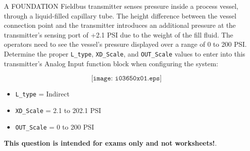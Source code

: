 

A FOUNDATION Fieldbus transmitter senses pressure inside a process vessel, through a liquid-filled capillary tube.  The height difference between the vessel connection point and the transmitter introduces an additional pressure at the transmitter's sensing port of +2.1 PSI due to the weight of the fill fluid.  The operators need to see the vessel's pressure displayed over a range of 0 to 200 PSI.  Determine the proper {\tt L\_type}, {\tt XD\_Scale}, and {\tt OUT\_Scale} values to enter into this transmitter's Analog Input function block when configuring the system:

$$\texttt{[image: i03650x01.eps]}$$







\begin{itemize}
\item{} {\tt L\_type} = Indirect
\item{} {\tt XD\_Scale} = 2.1 to 202.1 PSI 
\item{} {\tt OUT\_Scale} = 0 to 200 PSI
\end{itemize}







{\bf This question is intended for exams only and not worksheets!}.



